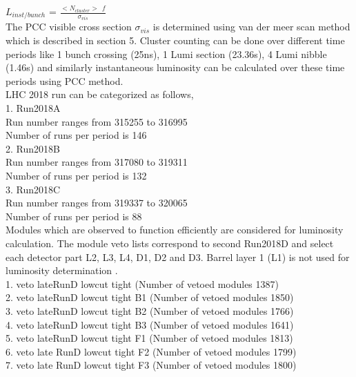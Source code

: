 $L_{inst/bunch}$ = $\frac{<N_{cluster}> \:\: f}{\sigma_{vis}}$ \\

The PCC visible cross section $\sigma_{vis}$ is determined using van der meer scan method which is described in section 5. Cluster counting can be done over different time periods like 1 bunch crossing (25ns), 1 Lumi section (23.36s), 4 Lumi nibble (1.46s) and similarly instantaneous luminosity can be calculated over these time periods using PCC method. \\

LHC 2018 run can be categorized as follows, \\

1. Run2018A \\

Run number ranges from 315255 to 316995 \\
Number of runs per period is 146 \\

2. Run2018B\\

Run number ranges from 317080 to 319311\\
Number of runs per period is 132\\

3. Run2018C \\

Run number ranges from 319337 to 320065\\
Number of runs per period is 88 \\

Modules which are observed to function efficiently are considered for luminosity calculation. The module veto lists correspond to second Run2018D and select each detector part L2, L3, L4, D1, D2 and D3. Barrel layer 1 (L1) is not used for luminosity determination \cite{vetolist}. \\

1. veto lateRunD lowcut tight   (Number of vetoed modules 1387) \\
2. veto lateRunD lowcut tight B1 (Number of vetoed modules 1850)\\
3. veto lateRunD lowcut tight B2 (Number of vetoed modules 1766)\\
4. veto lateRunD lowcut tight B3 (Number of vetoed modules 1641)\\
5. veto lateRunD lowcut tight F1 (Number of vetoed modules 1813)\\
6. veto late RunD lowcut tight F2 (Number of vetoed modules 1799)\\
7. veto late RunD lowcut tight F3 (Number of vetoed modules 1800)\\

